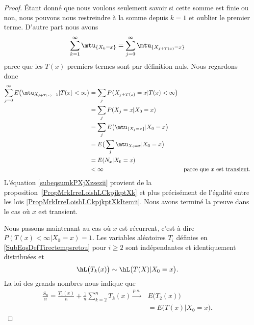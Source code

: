 \begin{proof}
	Étant donné que nous voulons seulement savoir si cette somme est finie ou non, nous pouvons nous restreindre à la somme depuis \( k=1\) et oublier le premier terme. D'autre part nous avons
	\begin{equation}
		\sum_{k=1}^{\infty}\mtu_{\{ X_k=x \}}=\sum_{j=0}^{\infty}\mtu_{\{ X_{j+T(x)}=x \}}
	\end{equation}
	parce que les \( T(x)\) premiers termes sont par définition nuls. Nous regardons donc
	\begin{subequations}
		\begin{align}
			\sum_{j=0}^{\infty}E\big( \mtu_{X_{j+T(x)}=x}|T(x)<\infty \big) & =\sum_{j}P\big( X_{j+T(x)}=x|T(x)<\infty \big)                                                 \\
			                                                                & =\sum_jP(X_j=x|X_0=x)  \label{subeqsumkPXjXzsezii}                                             \\
			                                                                & =\sum_jE\big( \mtu_{\{ X_j=x \}}|X_0=x \big)                                                   \\
			                                                                & =E\big( \sum_j\mtu_{X_j=x}|X_0=x \big)                                                         \\
			                                                                & =E(N_x|X_0=x)                                                                                  \\
			                                                                & <\infty                                            & \text{parce que } x\text{ est transient.}
		\end{align}
	\end{subequations}
	L'équation \eqref{subeqsumkPXjXzsezii} provient de la proposition~\ref{PropMrkIrreLoishLCkpjkptXk} et plus précisément de l'égalité entre les lois \eqref{PropMrkIrreLoishLCkpjkptXkItemii}. Nous avons terminé la preuve dans le cas où \( x\) est transient.

	Nous passons maintenant au cas où \( x\) est récurrent, c'est-à-dire \( P(T(x)<\infty|X_0=x)=1\). Les variables aléatoires \( T_i\) définies en \eqref{SubEqsDefTirectempsretou} pour \( i\geq 2\) sont indépendantes et identiquement distribuées et
	\begin{equation}
		\hL\big( T_k(x) \big)\sim\hL\big( T(X)|X_0=x \big).
	\end{equation}
	La loi des grands nombres nous indique que
	\begin{subequations}        \label{EqlgnMarkdemked}
		\begin{align}
			\frac{ S_n }{ n }=\frac{ T_1(x) }{ n }+\frac{1}{ n }\sum_{k=2}^nT_k(x)\stackrel{p.s.}{\longrightarrow} & E\big( T_2(x) \big)       \\
			                                                                                                       & =E\big( T(x)|X_0=x \big).
		\end{align}
	\end{subequations}


\end{proof}

